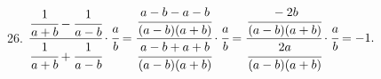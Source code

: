 26. $\cfrac{\cfrac{1}{a+b}-\cfrac{1}{a-b}}{\cfrac{1}{a+b}+\cfrac{1}{a-b}}\cdot\cfrac{a}{b}=\cfrac{\cfrac{a-b-a-b}{(a-b)(a+b)}}{\cfrac{a-b+a+b}{(a-b)(a+b)}}\cdot\cfrac{a}{b}=
\cfrac{\cfrac{-2b}{(a-b)(a+b)}}{\cfrac{2a}{(a-b)(a+b)}}\cdot\cfrac{a}{b}=-1.$\\

